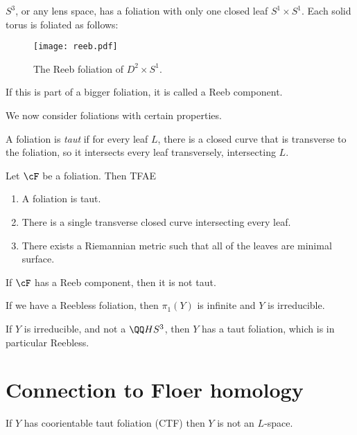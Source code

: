\documentclass{amsart}
\begin{document}
\begin{exm}
$S^3$, or any lens space, has a foliation with only one closed leaf $S^1\times S^1$. 
Each solid torus is foliated as follows:
\begin{figure}
\texttt{[image: reeb.pdf]}
\caption{The Reeb foliation of $D^2\times S^1$.}
\label{fig:reeb_foliation}
\end{figure}
If this is part of a bigger foliation, it is called a Reeb component.
\end{exm}

We now consider foliations with certain properties.

\begin{defn}
A foliation is \emph{taut} if for every leaf $L$, 
there is a closed curve that is transverse to the foliation, so it intersects every leaf transversely,
intersecting $L$.
\end{defn}

\begin{thm}
Let $\cF$ be a foliation. Then TFAE
\begin{enumerate}
\item A foliation is taut.
\item There is a single transverse closed curve intersecting every leaf.
\item There exists a Riemannian metric such that all of the leaves are minimal surface.
\end{enumerate}
\end{thm}

\begin{prop}
If $\cF$ has a Reeb component, then it is not taut.
\end{prop}

\begin{thm}[Novikov]
If we have a Reebless foliation, then $\pi_1\left( Y \right)$ is infinite
and $Y$ is irreducible. 
\end{thm}

\begin{thm}[Gabai]
If $Y$ is irreducible, and not a $\QQ HS^3$, 
then $Y$ has a taut foliation, which is in particular Reebless.
\end{thm}

\section{Connection to Floer homology}

\begin{thm}
If $Y$ has coorientable taut foliation (CTF) then $Y$ is not an $L$-space. 
\end{thm}
\end{document}
